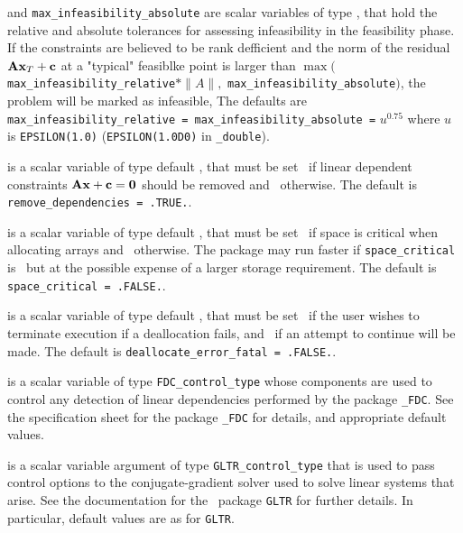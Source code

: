 \begin{description}
 and {\tt max\_infeasibility\_absolute} 
are scalar variables of type \realdp, 
that hold the relative and absolute tolerances for assessing 
infeasibility in the feasibility phase.  If the constraints are believed to be 
rank defficient and the norm of the residual ${\mathbf{A}} {\mathbf{x}}_T + {\mathbf{c}}$
at a "typical" feasiblke point is larger than
  $\max( ${\tt max\_infeasibility\_relative}$ \ast \| A\|,$ 
{\tt max\_infeasibility\_absolute}$)$,
the problem will be marked as infeasible,
The defaults are 
{\tt max\_infeasibility\_relative = 
\tt max\_infeasibility\_absolute =} $u^{0.75}$
where $u$ is {\tt EPSILON(1.0)} ({\tt EPSILON(1.0D0)} in 
{\tt \fullpackagename\_double}).

 is a scalar variable of type default \logical, 
that must be set \true\ if linear dependent constraints
${\mathbf{A}} {\mathbf{x}} + {\mathbf{c}} = {\mathbf{0}}$ should be removed and \false\ otherwise.
The default is {\tt remove\_dependencies = .TRUE.}.


 is a scalar variable of type default \logical, 
that must be set \true\ if space is critical when allocating arrays
and  \false\ otherwise. The package may run faster if 
{\tt space\_critical} is \false\ but at the possible expense of a larger
storage requirement. The default is {\tt space\_critical = .FALSE.}.

 is a scalar variable of type default \logical, 
that must be set \true\ if the user wishes to terminate execution if
a deallocation  fails, and \false\ if an attempt to continue
will be made. The default is {\tt deallocate\_error\_fatal = .FALSE.}.

 is a scalar variable of type 
{\tt FDC\_control\_type}
whose components are used to control any detection of linear dependencies
performed by the package 
{\tt \libraryname\_FDC}. 
See the specification sheet for the package 
{\tt \libraryname\_FDC} 
for details, and appropriate default values.

 is a scalar variable argument of type 
{\tt GLTR\_control\_type} that is used to pass control
options to the conjugate-gradient solver used to solve linear systems that arise. 
See the documentation for the \galahad\ package {\tt GLTR} for further details. 
In particular, default values are as for {\tt GLTR}.


\end{description}
